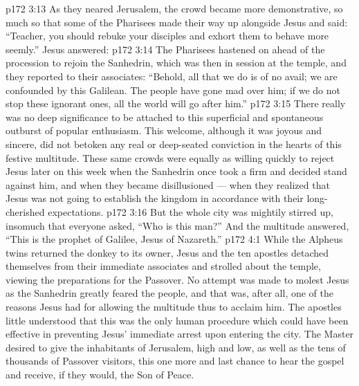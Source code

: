 \vs p172 3:13 As they neared Jerusalem, the crowd became more demonstrative, so much so that some of the Pharisees made their way up alongside Jesus and said: “Teacher, you should rebuke your disciples and exhort them to behave more seemly.” Jesus answered: 
\vs p172 3:14 The Pharisees hastened on ahead of the procession to rejoin the Sanhedrin, which was then in session at the temple, and they reported to their associates: “Behold, all that we do is of no avail; we are confounded by this Galilean. The people have gone mad over him; if we do not stop these ignorant ones, all the world will go after him.”
\vs p172 3:15 There really was no deep significance to be attached to this superficial and spontaneous outburst of popular enthusiasm. This welcome, although it was joyous and sincere, did not betoken any real or deep\hyp{}seated conviction in the hearts of this festive multitude. These same crowds were equally as willing quickly to reject Jesus later on this week when the Sanhedrin once took a firm and decided stand against him, and when they became disillusioned --- when they realized that Jesus was not going to establish the kingdom in accordance with their long\hyp{}cherished expectations.
\vs p172 3:16 But the whole city was mightily stirred up, insomuch that everyone asked, “Who is this man?” And the multitude answered, “This is the prophet of Galilee, Jesus of Nazareth.”
\vs p172 4:1 While the Alpheus twins returned the donkey to its owner, Jesus and the ten apostles detached themselves from their immediate associates and strolled about the temple, viewing the preparations for the Passover. No attempt was made to molest Jesus as the Sanhedrin greatly feared the people, and that was, after all, one of the reasons Jesus had for allowing the multitude thus to acclaim him. The apostles little understood that this was the only human procedure which could have been effective in preventing Jesus’ immediate arrest upon entering the city. The Master desired to give the inhabitants of Jerusalem, high and low, as well as the tens of thousands of Passover visitors, this one more and last chance to hear the gospel and receive, if they would, the Son of Peace.
